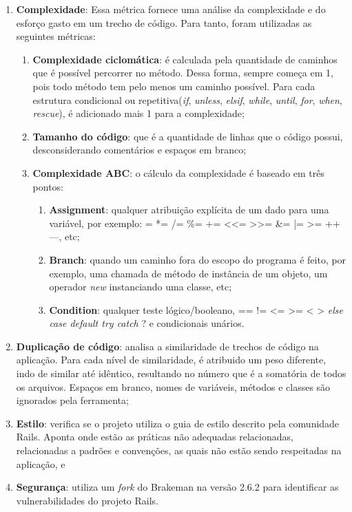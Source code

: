 \begin{enumerate}
	\item \textbf{Complexidade}: Essa métrica fornece uma análise da complexidade e do esforço gasto em um trecho de código. Para tanto, foram utilizadas as seguintes métricas:
	\begin{enumerate}
		\item \textbf{Complexidade ciclomática}: é calculada pela quantidade de caminhos que é possível percorrer no método. Dessa forma, sempre começa em 1, pois todo método tem pelo menos um caminho possível. Para cada estrutura condicional ou repetitiva(\textit{if}, \textit{unless}, \textit{elsif}, \textit{while}, \textit{until}, \textit{for}, \textit{when}, \textit{rescue}), é adicionado mais 1 para a complexidade;
		\item \textbf{Tamanho do código}: que é a quantidade de linhas que o código possui, desconsiderando comentários e espaços em branco;
		\item \textbf{Complexidade ABC}: o cálculo da complexidade é baseado em três pontos:
		\begin{enumerate}
			\item \textbf{Assignment}: qualquer atribuição explícita de um dado para uma variável, por exemplo: = *= /= \%= += <<= >>= \&= |= >= ++ —, etc;
		    \item \textbf{Branch}: quando um caminho fora do escopo do programa é feito, por exemplo, uma chamada de método de instância de um objeto, um operador \textit{new} instanciando uma classe, etc;
    		\item \textbf{Condition}: qualquer teste lógico/booleano, == != <= >= < > \textit{else case default try catch} ? e condicionais unários.
		\end{enumerate}
	\end{enumerate}
	\item \textbf{Duplicação de código}: analisa a similaridade de trechos de código na aplicação. Para cada nível de similaridade, é atribuido um peso diferente, indo de similar até idêntico, resultando no número que é a somatória de todos os arquivos. Espaços em branco, nomes de variáveis, métodos e classes são ignorados pela ferramenta;
	\item \textbf{Estilo}: verifica se o projeto utiliza o guia de estilo descrito pela comunidade Rails. Aponta onde estão as práticas não adequadas relacionadas, relacionadas a padrões e convenções, as quais não estão sendo respeitadas na aplicação, e
	\item \textbf{Segurança}: utiliza um \textit{fork} do Brakeman na versão 2.6.2 para identificar as vulnerabilidades do projeto Rails.
\end{enumerate}

